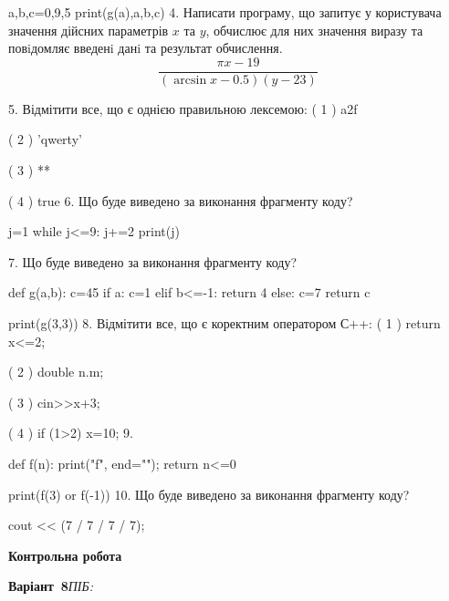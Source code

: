 \documentclass[11pt]{article}
\begin{document}
a,b,c=0,9,5
print(g(a),a,b,c)
\vspace{5mm}
4. 
Написати програму, що запитує у користувача значення дійсних параметрів $x$ та $y$, обчислює для них значення виразу та повiдомляє введенi данi та результат обчислення.
$$\frac{\pi x - 19}{(\arcsin x - 0.5) (y - 23)}$$ 

\vspace{5mm}
5. %
Відмітити все, що є однією правильною лексемою:
( 1 ) a2f

( 2 ) 'qwerty'

( 3 ) **

( 4 ) true
\vspace{5mm}
6. Що буде виведено за виконання фрагменту коду?

j=1
while j<=9:
    j+=2
print(j)

\vspace{5mm}
7. Що буде виведено за виконання фрагменту коду?

def g(a,b):
    c=45
    if a:
        c=1
    elif b<=-1:
         return 4
    else: 
        c=7
    return c

print(g(3,3))
\vspace{5mm}
8. %
Відмітити все, що є коректним оператором С++:
( 1 ) return x<=2;

( 2 ) double n.m;

( 3 ) cin>>x+3;

( 4 ) if (1>2) x=10;
\vspace{5mm}
9. 

def f(n):
    print("f", end="");
    return n<=0

print(f(3) or f(-1))
\vspace{5mm}
10. Що буде виведено за виконання фрагменту коду?

cout << (7 / 7 / 7 / 7);
\vspace{5mm}










\newpage

\newpage

{\large\textbf{Контрольна робота}}

\textbf{Варіант \No\,8}\hfill \textit{ПІБ:}\,\underline{\hspace{60mm}}
\vspace{4mm}
\end{document}
